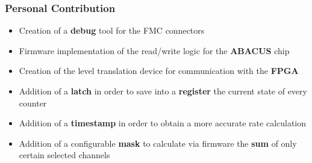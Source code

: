 \documentclass[aspectratio=169]{beamer}
\begin{document}
	
	\begin{frame}
	\frametitle{Personal Contribution}
	\begin{itemize}
		\item {\color{green} Creation of a \textbf{debug} tool for the FMC connectors}
		\item {\color{green} Firmware implementation of the read/write logic for the \textbf{ABACUS} chip}
		\item {\color{green} Creation of the level translation device for communication with the \textbf{FPGA}}
		\item {\color{orange} Addition of a \textbf{latch} in order to save into a \textbf{register} the current state of every counter}
		\item {\color{orange} Addition of a \textbf{timestamp} in order to obtain a more accurate rate calculation}
		\item {\color{orange} Addition of a configurable \textbf{mask} to calculate via firmware the \textbf{sum} of only certain selected channels}
	\end{itemize}
	\end{frame}
	
\end{document}
